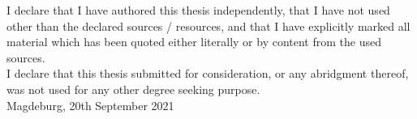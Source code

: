 \documentclass[12pt,dvipsnames]{article}%
\begin{document}
\clearpage
 
\newpage

\makeatletter
\setlength{\@fptop}{0pt}
\makeatother

\begin{table}

I declare that I have authored this thesis independently, that I
have not used other than the declared sources / resources, and that
I have explicitly marked all material which has been quoted either
literally or by content from the used sources. \\
I declare that this thesis submitted for consideration, or any abridgment thereof, was not used for any other degree seeking purpose. \\
Magdeburg, 20th September 2021

\end{table}
 

 
\end{document}
